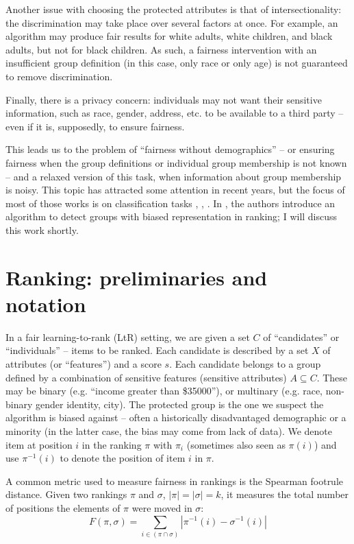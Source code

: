 Another issue with choosing the protected attributes is that of intersectionality: the discrimination may take place over several factors at once. For example, an algorithm may produce fair results for white adults, white children, and black adults, but not for black children. As such, a fairness intervention with an insufficient group definition (in this case, only race or only age) is not guaranteed to remove discrimination.

Finally, there is a privacy concern: individuals may not want their sensitive information, such as race, gender, address, etc. to be available to a third party – even if it is, supposedly, to ensure fairness.

This leads us to the problem of “fairness without demographics” – or ensuring fairness when the group definitions or individual group membership is not known – and a relaxed version of this task, when information about group membership is noisy. This topic has attracted some attention in recent years, but the focus of most of those works is on classification tasks \cite{https://arxiv.org/pdf/1904.05419.pdf}, \cite{MithraCoverage}, \cite{https://www.vldb.org/pvldb/vol14/p2719-moskovitch.pdf}. In \cite{detectionofgroups}, the authors introduce an algorithm to detect groups with biased representation in ranking; I will discuss this work shortly.

\section{Ranking: preliminaries and notation}\label{sect:int_2}

In a fair learning-to-rank (LtR) setting, we are given a set $C$ of “candidates” or “individuals” – items to be ranked. Each candidate is described by a set $X$ of attributes (or “features”) and a score $s$. Each candidate belongs to a group defined by a combination of sensitive features (sensitive attributes) $A\subseteq C$. These may be binary (e.g. “income greater than \$35000”), or multinary (e.g. race, non-binary gender identity, city). The protected group is the one we suspect the algorithm is biased against – often a historically disadvantaged demographic or a minority (in the latter case, the bias may come from lack of data). We denote item at position $i$ in the ranking $\pi$ with $\pi_i$ (sometimes also seen as $\pi(i)$) and use $\pi^{-1}(i)$ to denote the position of item $i$ in $\pi$.

A common metric used to measure fairness in rankings is the Spearman footrule distance. Given two rankings $\pi$ and $\sigma$, $|\pi| = |\sigma|=k$, it measures the total number of positions the elements of $\pi$ were moved in $\sigma$:
\begin{equation*}\label{eq:spearman}
F(\pi, \sigma) = \sum_{i \in (\pi \cap \sigma)} |\pi^{-1}(i) - \sigma^{-1}(i)|
\end{equation*}


